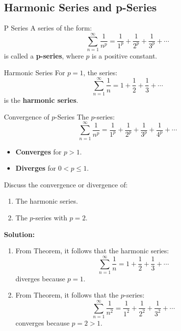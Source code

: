 \documentclass[12pt]{article}
\theoremstyle{beautifulthm}
\begin{document}
\subsection{Harmonic Series
and p-Series}
\begin{Definition}{P Series}{}
    A series of the form:
\[
\sum_{n=1}^\infty \frac{1}{n^p} = \frac{1}{1^p} + \frac{1}{2^p} + \frac{1}{3^p} + \cdots
\]
is called a \textbf{p-series}, where $p$ is a positive constant.
\end{Definition}


\begin{Definition}{Harmonic Series}{}
For $p = 1$, the series:
\[
\sum_{n=1}^\infty \frac{1}{n} = 1 + \frac{1}{2} + \frac{1}{3} + \cdots
\]
is the \textbf{harmonic series}.
\end{Definition}

\begin{mytheorem}{ Convergence of $p$-Series}{}
    The $p$-series:
\[
\sum_{n=1}^\infty \frac{1}{n^p} = \frac{1}{1^p} + \frac{1}{2^p} + \frac{1}{3^p} + \frac{1}{4^p} + \cdots
\]
\begin{itemize}
    \item \textbf{Converges} for $p > 1$.
    \item \textbf{Diverges} for $0 < p \leq 1$.
\end{itemize}
\end{mytheorem}

\begin{tcolorbox}[colback=examplebg, colframe=red!75!black, title=\textbf{EXAMPLE 1: Convergent and Divergent $p$-Series}, fonttitle=\bfseries, sharp corners]

Discuss the convergence or divergence of:
\begin{enumerate}
    \item The harmonic series.
    \item The $p$-series with $p = 2$.
\end{enumerate}

\tcblower
\textbf{Solution:} 
\begin{enumerate}
    \item From Theorem, it follows that the harmonic series:
    \[
    \sum_{n=1}^\infty \frac{1}{n} = 1 + \frac{1}{2} + \frac{1}{3} + \cdots
    \]
    diverges because $p = 1$.

    \item From Theorem, it follows that the $p$-series:
    \[
    \sum_{n=1}^\infty \frac{1}{n^2} = \frac{1}{1^2} + \frac{1}{2^2} + \frac{1}{3^2} + \cdots
    \]
    converges because $p = 2 > 1$.
\end{enumerate}
\end{tcolorbox}
\end{document}
